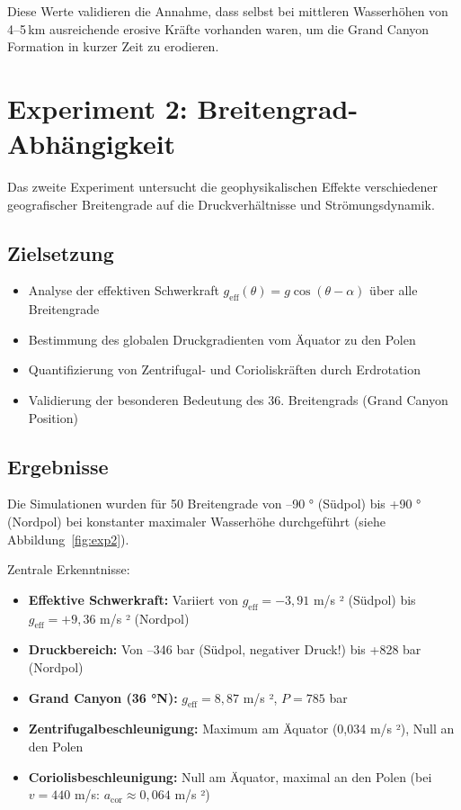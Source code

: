 ﻿\documentclass[12pt,a4paper]{report}
\begin{document}
Diese Werte validieren die Annahme, dass selbst bei mittleren Wasserhöhen von 4--5\,km ausreichende erosive Kräfte vorhanden waren, um die Grand Canyon Formation in kurzer Zeit zu erodieren.

\section{Experiment 2: Breitengrad-Abhängigkeit}

Das zweite Experiment untersucht die geophysikalischen Effekte verschiedener geografischer Breitengrade auf die Druckverhältnisse und Strömungsdynamik.

\subsection{Zielsetzung}

\begin{itemize}
	\item Analyse der effektiven Schwerkraft $g_{\text{eff}}(\theta) = g \cos(\theta - \alpha)$ über alle Breitengrade
	\item Bestimmung des globalen Druckgradienten vom Äquator zu den Polen
	\item Quantifizierung von Zentrifugal- und Corioliskräften durch Erdrotation
	\item Validierung der besonderen Bedeutung des 36. Breitengrads (Grand Canyon Position)
\end{itemize}

\subsection{Ergebnisse}

Die Simulationen wurden für 50 Breitengrade von --90 ° (Südpol) bis +90 ° (Nordpol) bei konstanter maximaler Wasserhöhe durchgeführt (siehe Abbildung~\ref{fig:exp2}).

Zentrale Erkenntnisse:

\begin{itemize}
	\item \textbf{Effektive Schwerkraft:} Variiert von $g_{\text{eff}} = -3{,}91$ m/s ² (Südpol) bis $g_{\text{eff}} = +9{,}36$ m/s ² (Nordpol)
	
	\item \textbf{Druckbereich:} Von --346 bar (Südpol, negativer Druck!) bis +828 bar (Nordpol)
	
	\item \textbf{Grand Canyon (36 °N):} $g_{\text{eff}} = 8{,}87$ m/s ², $P = 785$ bar
	
	\item \textbf{Zentrifugalbeschleunigung:} Maximum am Äquator (0,034 m/s ²), Null an den Polen
	
	\item \textbf{Coriolisbeschleunigung:} Null am Äquator, maximal an den Polen (bei $v = 440$ m/s: $a_{\text{cor}} \approx 0{,}064$ m/s ²)
\end{itemize}
\end{document}

